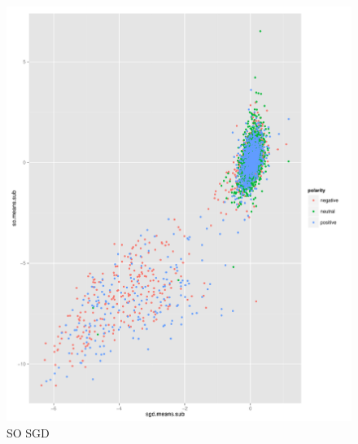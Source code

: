 \documentclass{sig-alternate}
\begin{document}
\begin{figure}[ht]
	\centering
	\includegraphics[scale=0.3]{sosgdSub.pdf}
	\caption{SO SGD}
	\label{fig:sosgdSub}
\end{figure}
\end{document}
